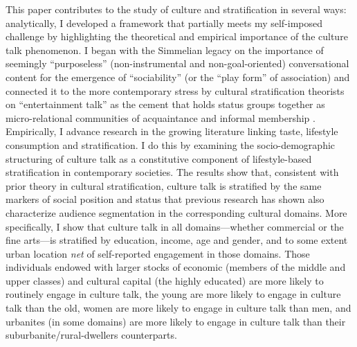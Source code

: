 This paper contributes to the study of culture and stratification in several ways: analytically, I developed a framework that partially meets my self-imposed challenge by highlighting the theoretical and empirical importance of the culture talk phenomenon. I began with the Simmelian legacy on the importance of seemingly ``purposeless'' (non-instrumental and non-goal-oriented) conversational content for the emergence of ``sociability'' (or the ``play form'' of association) and connected it to the more contemporary stress by cultural stratification theorists on ``entertainment talk'' as the cement that holds status groups together as micro-relational communities of acquaintance and informal membership \citep{collins75, dimaggio87, gainer95, purcell07, lizardo06a, rivera12}. Empirically, I advance research in the growing literature linking taste, lifestyle consumption and stratification. I do this by examining the socio-demographic structuring of culture talk as a constitutive component of lifestyle-based stratification in contemporary societies. The results  show that, consistent with prior theory in cultural stratification, culture talk is stratified by the same markers of social position and status that previous research has shown also characterize audience segmentation in the corresponding cultural domains. More specifically, I show that culture talk in all domains---whether commercial or the fine arts---is stratified by education, income, age and gender, and to some extent urban location \emph{net} of self-reported engagement in those domains.  Those individuals endowed with larger stocks of economic (members of the middle and upper classes) and cultural capital (the highly educated) are more likely to routinely engage in culture talk, the young are more likely to engage in culture talk than the old,  women are more likely to engage in culture talk than men, and urbanites (in some domains) are more likely to engage in culture talk than their suburbanite/rural-dwellers counterparts.   

